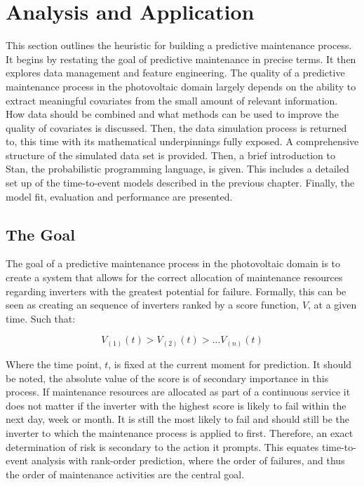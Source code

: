 \chapter*{Analysis and Application}


This section outlines the heuristic for building a predictive maintenance process. It begins by restating the goal of predictive maintenance in precise terms. It then explores data management and feature engineering. The quality of a predictive maintenance process in the photovoltaic domain largely depends on the ability to extract meaningful covariates from the small amount of relevant information. How data should be combined and what methods can be used to improve the quality of covariates is discussed. Then, the data simulation process is returned to, this time with its mathematical underpinnings fully exposed. A comprehensive structure of the simulated data set is provided. Then, a brief introduction to Stan, the probabilistic programming language, is given. This includes a detailed set up of the time-to-event models described in the previous chapter. Finally, the model fit, evaluation and performance are presented.

\section*{The Goal}

The goal of a predictive maintenance process in the photovoltaic domain is to create a system that allows for the correct allocation of maintenance resources regarding inverters with the greatest potential for failure. Formally, this can be seen as creating an sequence of inverters ranked by a score function, $V$, at a given time. Such that:

$$ V_{(1)}(t) > V_{(2)}(t) > \dots V_{(n)}(t) $$

Where the time point, $t$, is fixed at the current moment for prediction. It should be noted, the absolute value of the score is of secondary importance in this process. If maintenance resources are allocated as part of a continuous service it does not matter if the inverter with the highest score is likely to fail within the next day, week or month. It is still the most likely to fail and should still be the inverter to which the maintenance process is applied to first. Therefore, an exact determination of risk is secondary to the action it prompts. This equates time-to-event analysis with rank-order prediction, where the order of failures, and thus the order of maintenance activities are the central goal. 


